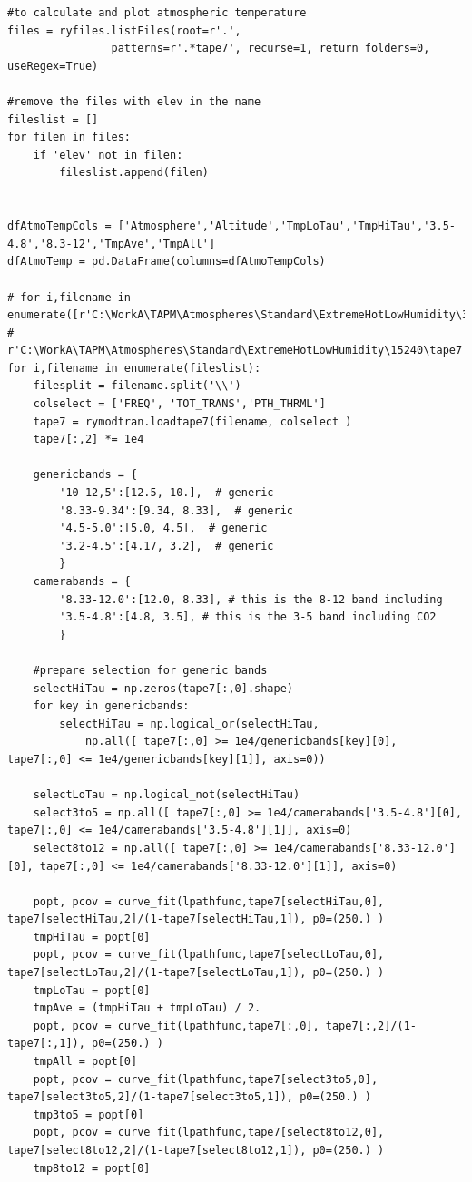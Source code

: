\documentclass{workpackage}
\begin{document}
\begin{lstlisting}[style=incellstyle,caption={Code Listing in cell 21 \label{lst:autolistingcell21}}]
#to calculate and plot atmospheric temperature
files = ryfiles.listFiles(root=r'.', 
                patterns=r'.*tape7', recurse=1, return_folders=0, useRegex=True)

#remove the files with elev in the name
fileslist = []
for filen in files:
    if 'elev' not in filen:
        fileslist.append(filen)


dfAtmoTempCols = ['Atmosphere','Altitude','TmpLoTau','TmpHiTau','3.5-4.8','8.3-12','TmpAve','TmpAll']
dfAtmoTemp = pd.DataFrame(columns=dfAtmoTempCols)

# for i,filename in enumerate([r'C:\WorkA\TAPM\Atmospheres\Standard\ExtremeHotLowHumidity\305\tape7',
#                             r'C:\WorkA\TAPM\Atmospheres\Standard\ExtremeHotLowHumidity\15240\tape7']):
for i,filename in enumerate(fileslist):
    filesplit = filename.split('\\')
    colselect = ['FREQ', 'TOT_TRANS','PTH_THRML']
    tape7 = rymodtran.loadtape7(filename, colselect )
    tape7[:,2] *= 1e4

    genericbands = {
        '10-12,5':[12.5, 10.],  # generic
        '8.33-9.34':[9.34, 8.33],  # generic
        '4.5-5.0':[5.0, 4.5],  # generic
        '3.2-4.5':[4.17, 3.2],  # generic
        }
    camerabands = {    
        '8.33-12.0':[12.0, 8.33], # this is the 8-12 band including 
        '3.5-4.8':[4.8, 3.5], # this is the 3-5 band including CO2
        }
    
    #prepare selection for generic bands
    selectHiTau = np.zeros(tape7[:,0].shape)
    for key in genericbands:
        selectHiTau = np.logical_or(selectHiTau, 
            np.all([ tape7[:,0] >= 1e4/genericbands[key][0], tape7[:,0] <= 1e4/genericbands[key][1]], axis=0))

    selectLoTau = np.logical_not(selectHiTau)
    select3to5 = np.all([ tape7[:,0] >= 1e4/camerabands['3.5-4.8'][0], tape7[:,0] <= 1e4/camerabands['3.5-4.8'][1]], axis=0)
    select8to12 = np.all([ tape7[:,0] >= 1e4/camerabands['8.33-12.0'][0], tape7[:,0] <= 1e4/camerabands['8.33-12.0'][1]], axis=0)
   
    popt, pcov = curve_fit(lpathfunc,tape7[selectHiTau,0], tape7[selectHiTau,2]/(1-tape7[selectHiTau,1]), p0=(250.) )
    tmpHiTau = popt[0]
    popt, pcov = curve_fit(lpathfunc,tape7[selectLoTau,0], tape7[selectLoTau,2]/(1-tape7[selectLoTau,1]), p0=(250.) )
    tmpLoTau = popt[0]
    tmpAve = (tmpHiTau + tmpLoTau) / 2.
    popt, pcov = curve_fit(lpathfunc,tape7[:,0], tape7[:,2]/(1-tape7[:,1]), p0=(250.) )
    tmpAll = popt[0]
    popt, pcov = curve_fit(lpathfunc,tape7[select3to5,0], tape7[select3to5,2]/(1-tape7[select3to5,1]), p0=(250.) )
    tmp3to5 = popt[0]
    popt, pcov = curve_fit(lpathfunc,tape7[select8to12,0], tape7[select8to12,2]/(1-tape7[select8to12,1]), p0=(250.) )
    tmp8to12 = popt[0]
    

\end{lstlisting}
\end{document}
